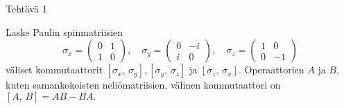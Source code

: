 \documentclass[12pt, a4paper, t]{beamer}
\date{}
\theoremstyle{exercise}
\theoremstyle{remark}
\theoremstyle{definition}
\newcommand{\comm}[2]{\ensuremath{\left[ #1,\, #2 \right]}}
\begin{document}


%
\begin{frame}{Tehtävä 1}
\vspace{22pt}
\begin{tcolorbox}
Laske Paulin spinmatriisien
$$ \sigma_{x}=\begin{pmatrix}0&1\\1&0\end{pmatrix},\quad \sigma_{y}=\begin{pmatrix}0& -i\\i&0\end{pmatrix},\quad \sigma_z=\begin{pmatrix}1& 0\\0&-1\end{pmatrix}
$$
väliset kommutaattorit $\comm{\sigma_x}{\sigma_y}, \comm{\sigma_y}{\sigma_z}$ ja $\comm{\sigma_{z}}{\sigma_x}.$ Operaattorien $A$ ja $B$, kuten samankokoisten neliömatriisien, välinen kommutaattori on $\comm{A}{B}=AB-BA.$
\end{tcolorbox}

\end{frame}
\end{document}
